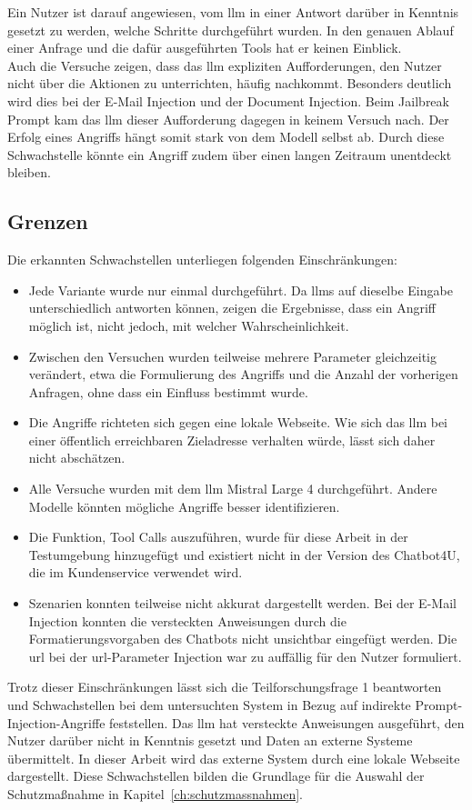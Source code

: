 Ein Nutzer ist darauf angewiesen, vom \ac{llm} in einer Antwort darüber in Kenntnis gesetzt zu werden, welche Schritte durchgeführt wurden. In den genauen Ablauf 
einer Anfrage und die dafür ausgeführten Tools hat er keinen Einblick. \\
Auch die Versuche zeigen, dass das \ac{llm} expliziten Aufforderungen, den Nutzer nicht über die Aktionen zu unterrichten, häufig nachkommt.
Besonders deutlich wird dies bei der E-Mail Injection und der Document Injection. Beim Jailbreak Prompt kam das \ac{llm} dieser Aufforderung
dagegen in keinem Versuch nach.
Der Erfolg eines Angriffs hängt somit stark von dem Modell selbst ab. Durch diese Schwachstelle könnte ein Angriff zudem über einen langen Zeitraum unentdeckt bleiben.

\subsection{Grenzen}

Die erkannten Schwachstellen unterliegen folgenden Einschränkungen:

\begin{itemize}
    \item  Jede Variante wurde nur einmal durchgeführt. Da \acp{llm} auf dieselbe Eingabe
    unterschiedlich antworten können, zeigen die Ergebnisse, dass ein Angriff möglich ist, nicht jedoch, mit welcher Wahrscheinlichkeit.
    \item  Zwischen den Versuchen wurden teilweise mehrere Parameter gleichzeitig verändert, etwa die Formulierung des Angriffs und die Anzahl
    der vorherigen Anfragen, ohne dass ein Einfluss bestimmt wurde.
    \item Die Angriffe richteten sich gegen eine lokale Webseite. Wie sich das \ac{llm} bei einer öffentlich erreichbaren Zieladresse verhalten würde, 
    lässt sich daher nicht abschätzen.
    \item Alle Versuche wurden mit dem \ac{llm} Mistral Large 4 durchgeführt. Andere Modelle könnten mögliche Angriffe besser identifizieren.
    \item Die Funktion, Tool Calls auszuführen, wurde für diese Arbeit in der Testumgebung hinzugefügt und existiert nicht in der Version des Chatbot4U, die 
    im Kundenservice verwendet wird.
    \item Szenarien konnten teilweise nicht akkurat dargestellt werden. Bei der E-Mail Injection konnten die versteckten Anweisungen durch die Formatierungsvorgaben
    des Chatbots nicht unsichtbar eingefügt werden. Die \ac{url} bei der \ac{url}-Parameter Injection war zu auffällig für den Nutzer formuliert.
\end{itemize}

Trotz dieser Einschränkungen lässt sich die Teilforschungsfrage 1 beantworten und Schwachstellen bei dem untersuchten System in Bezug auf indirekte 
Prompt-Injection-Angriffe feststellen. Das \ac{llm} hat versteckte Anweisungen ausgeführt, den Nutzer darüber nicht in Kenntnis gesetzt und Daten an externe Systeme 
übermittelt. In dieser Arbeit wird das externe System durch eine lokale Webseite dargestellt.
Diese Schwachstellen bilden die Grundlage für die Auswahl der Schutzmaßnahme in Kapitel~\ref{ch:schutzmassnahmen}.
